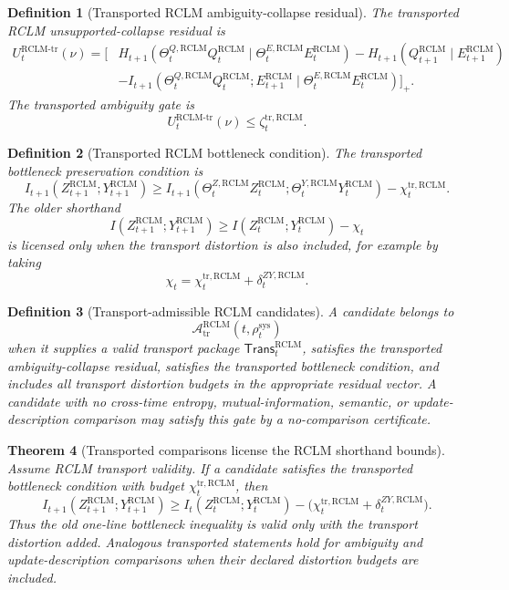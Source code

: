 \documentclass[11pt,a4paper]{article}
\newtheorem{theorem}{Theorem}[section]
\newtheorem{definition}[theorem]{Definition}
\newcommand{\Acal}{\mathcal A}
\newcommand{\RCLM}{\mathrm{RCLM}}
\newcommand{\sys}{\mathrm{sys}}
\begin{document}
\begin{definition}[Transported RCLM ambiguity-collapse residual]
\label{def:rclm-transported-ambiguity-residual}
The transported RCLM unsupported-collapse residual is
\[
\begin{aligned}
U_t^{\RCLM\text{-}\mathrm{tr}}(\nu)
=
\Big[&
H_{t+1}(\Theta_t^{Q,\RCLM}Q_t^{\RCLM}\mid \Theta_t^{E,\RCLM}E_t^{\RCLM})
-
H_{t+1}(Q_{t+1}^{\RCLM}\mid E_{t+1}^{\RCLM})\\
&-
I_{t+1}(\Theta_t^{Q,\RCLM}Q_t^{\RCLM};E_{t+1}^{\RCLM}\mid \Theta_t^{E,\RCLM}E_t^{\RCLM})
\Big]_+ .
\end{aligned}
\]
The transported ambiguity gate is
\[
U_t^{\RCLM\text{-}\mathrm{tr}}(\nu)\le \zeta_t^{\mathrm{tr},\RCLM}.
\]
\end{definition}

\begin{definition}[Transported RCLM bottleneck condition]
\label{def:rclm-transported-bottleneck-condition}
The transported bottleneck preservation condition is
\[
I_{t+1}(Z_{t+1}^{\RCLM};Y_{t+1}^{\RCLM})
\ge
I_{t+1}(\Theta_t^{Z,\RCLM}Z_t^{\RCLM};\Theta_t^{Y,\RCLM}Y_t^{\RCLM})
-
\chi_t^{\mathrm{tr},\RCLM}.
\]
The older shorthand
\[
I(Z_{t+1}^{\RCLM};Y_{t+1}^{\RCLM})
\ge
I(Z_t^{\RCLM};Y_t^{\RCLM})-
\chi_t
\]
is licensed only when the transport distortion is also included, for example by taking
\[
\chi_t=\chi_t^{\mathrm{tr},\RCLM}+\delta_t^{ZY,\RCLM}.
\]
\end{definition}

\begin{definition}[Transport-admissible RCLM candidates]
\label{def:rclm-transport-admissible-candidates}
A candidate belongs to
\[
\Acal_{\mathrm{tr}}^{\RCLM}(t,\rho_t^{\sys})
\]
when it supplies a valid transport package \(\mathsf{Trans}_t^{\RCLM}\), satisfies the transported ambiguity-collapse residual, satisfies the transported bottleneck condition, and includes all transport distortion budgets in the appropriate residual vector.  A candidate with no cross-time entropy, mutual-information, semantic, or update-description comparison may satisfy this gate by a no-comparison certificate.
\end{definition}

\begin{theorem}[Transported comparisons license the RCLM shorthand bounds]
\label{thm:rclm-transport-licenses-shorthand}
Assume RCLM transport validity.  If a candidate satisfies the transported bottleneck condition with budget \(\chi_t^{\mathrm{tr},\RCLM}\), then
\[
I_{t+1}(Z_{t+1}^{\RCLM};Y_{t+1}^{\RCLM})
\ge
I_t(Z_t^{\RCLM};Y_t^{\RCLM})
-
\bigl(\chi_t^{\mathrm{tr},\RCLM}+\delta_t^{ZY,\RCLM}\bigr).
\]
Thus the old one-line bottleneck inequality is valid only with the transport distortion added.  Analogous transported statements hold for ambiguity and update-description comparisons when their declared distortion budgets are included.
\end{theorem}
\end{document}
